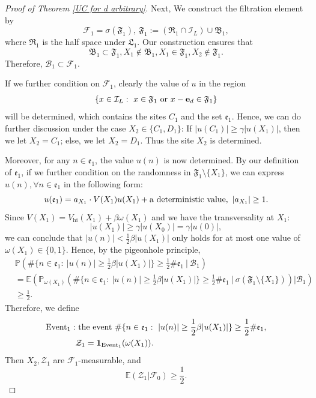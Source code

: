 \documentclass[11pt,reqno,UTF8,twoside]{amsart}
\newcommand{\E}{\mathbb{E}}
\newcommand{\event}{{\rm Event}}
\newcommand{\bfe}{\mathbf{e}}
\renewcommand{\P}{\mathbb{P}}
\newcommand{\mcB}{\mathcal{B}}
\newcommand{\mcF}{\mathcal{F}}
\newcommand{\mcI}{\mathcal{I}}
\newcommand{\mcZ}{\mathcal{Z}}
\theoremstyle{definition}
\numberwithin{equation}{section}
\begin{document}
\begin{proof}[Proof of Theorem \ref{UC for d arbitrary}]
Next, We construct the filtration element by 
\begin{equation}\label{mcF 1, d arbitrarily}
    \mcF_1=\sigma(\mathfrak{F}_1), \ \mathfrak{F}_1:= (\mathfrak{R}_1\cap \mcI_L )\cup \mathfrak{B}_1,
\end{equation}
where $\mathfrak{R}_1$ is the half space under $\mathfrak{L}_1$.
Our construction ensures that 
\begin{equation}\label{1 step relation}
 \mathfrak{B}_1 \subset \mathfrak{F}_1,  X_1 \notin \mathfrak{B}_1,   X_1\in \mathfrak{F}_1, X_2 \notin \mathfrak{F}_1. 
\end{equation}
{Therefore, $\mcB_1\subset \mcF_1$.} 

If we further condition on $\mcF_1$, clearly the value of $u$ in the region 
\[\{ x\in \mcI_L: \ x\in \mathfrak{F}_1  \ {\rm or} \ x-\bfe_d\in \mathfrak{F}_1 \}\]
will be determined, which contains the sites $C_1$ and the set $\mathfrak{e}_1$. Hence, we can do further discussion under the case $X_2\in \{C_1,D_1\}$: If $|u(C_1)|\geq \gamma |u(X_1)|$, then we let $X_2=C_1$; else, we let $X_2=D_1$. Thus the site $X_2$ is determined. 

Moreover, for any $n\in \mathfrak{e}_1$, the value $u(n)$ is now determined. By our definition of $\mathfrak{e}_1$, if we further condition on the randomness in $\mathfrak{F}_1\setminus \{X_1\}$, we can express $u(n),\forall n\in \mathfrak{e}_1$ in the following form:
\begin{equation}\label{u e1 value}
u(\mathfrak{e}_1) = a_{X_1} \cdot V(X_1)u(X_1)+ {\rm a\ deterministic \ value},\ |a_{X_1}|\geq 1. 
\end{equation}
Since $V(X_1)=V_{\text{hi}}(X_1)+ \beta \omega(X_1)$ and we have  the transversality at $X_1$:  
\[|u(X_1)|\geq \gamma |u(X_0)|=\gamma |u(0)|,\]
we can conclude that $|u(n)|<\frac{1}{2}\beta |u(X_1)|$ only holds for at most one value of $\omega(X_1)\in \{0,1\}$. 
Hence, by the pigeonhole principle,  
\begin{align*}
   &\P\left( \# \{ n\in \mathfrak{e}_1: \ |u(n)| \geq \frac{1}{2}\beta |u(X_1)| \}  \geq \frac{1}{2}\# \mathfrak{e}_1 \ \bigg|   \ \mcB_1 \right) \\
   &= \E \left(    \P_{\omega(X_1)}\left( \# \{ n\in \mathfrak{e}_1: \ |u(n)| \geq \frac{1}{2}\beta |u(X_1)| \}  \geq \frac{1}{2}\# \mathfrak{e}_1 \ \bigg|   \ \sigma(\mathfrak{F}_1 \setminus \{X_1\})  \right)  \bigg| \mcB_1 \right) \\
               &\geq \frac{1}{2}.
\end{align*}
Therefore, we define 
\begin{align*}
  \event_1:   & \ {\rm  the \ event \ }\# \{ n\in \mathfrak{e}_1:\  |u(n)| \geq \frac{1}{2}\beta |u(X_1)| \}  \geq \frac{1}{2}\# \mathfrak{e}_1, \\
  &\mcZ_1= \mathbf{1}_{\event_1}(\omega(X_1)).
\end{align*}
Then {$X_2,\mcZ_1$ are $\mcF_1$-measurable,} and 
\begin{equation*}
  \E(\mcZ_1 | \mcF_0)\geq \frac{1}{2}. 
\end{equation*}



\end{proof}
\end{document}
